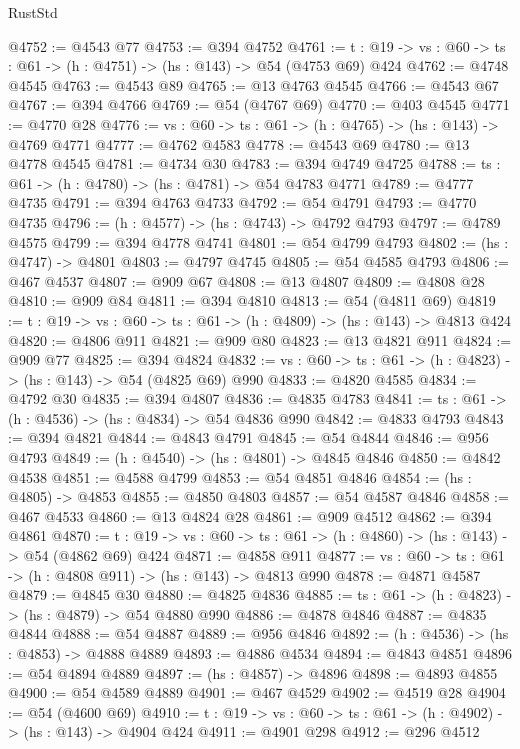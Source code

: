 \begin{lexlean}{RustStd}
\begin{coremodule}
@4752 := @4543 @77
@4753 := @394 @4752
@4761 := {t : @19} -> {vs : @60} -> {ts : @61} -> (h : @4751) -> (hs : @143) -> @54 (@4753 @69) @424
@4762 := @4748 @4545
@4763 := @4543 @89
@4765 := @13 @4763 @4545
@4766 := @4543 @67
@4767 := @394 @4766
@4769 := @54 (@4767 @69)
@4770 := @403 @4545
@4771 := @4770 @28
@4776 := {vs : @60} -> {ts : @61} -> (h : @4765) -> (hs : @143) -> @4769 @4771
@4777 := @4762 @4583
@4778 := @4543 @69
@4780 := @13 @4778 @4545
@4781 := @4734 @30
@4783 := @394 @4749 @4725
@4788 := {ts : @61} -> (h : @4780) -> (hs : @4781) -> @54 @4783 @4771
@4789 := @4777 @4735
@4791 := @394 @4763 @4733
@4792 := @54 @4791
@4793 := @4770 @4735
@4796 := (h : @4577) -> (hs : @4743) -> @4792 @4793
@4797 := @4789 @4575
@4799 := @394 @4778 @4741
@4801 := @54 @4799 @4793
@4802 := (hs : @4747) -> @4801
@4803 := @4797 @4745
@4805 := @54 @4585 @4793
@4806 := @467 @4537
@4807 := @909 @67
@4808 := @13 @4807
@4809 := @4808 @28
@4810 := @909 @84
@4811 := @394 @4810
@4813 := @54 (@4811 @69)
@4819 := {t : @19} -> {vs : @60} -> {ts : @61} -> (h : @4809) -> (hs : @143) -> @4813 @424
@4820 := @4806 @911
@4821 := @909 @80
@4823 := @13 @4821 @911
@4824 := @909 @77
@4825 := @394 @4824
@4832 := {vs : @60} -> {ts : @61} -> (h : @4823) -> (hs : @143) -> @54 (@4825 @69) @990
@4833 := @4820 @4585
@4834 := @4792 @30
@4835 := @394 @4807
@4836 := @4835 @4783
@4841 := {ts : @61} -> (h : @4536) -> (hs : @4834) -> @54 @4836 @990
@4842 := @4833 @4793
@4843 := @394 @4821
@4844 := @4843 @4791
@4845 := @54 @4844
@4846 := @956 @4793
@4849 := (h : @4540) -> (hs : @4801) -> @4845 @4846
@4850 := @4842 @4538
@4851 := @4588 @4799
@4853 := @54 @4851 @4846
@4854 := (hs : @4805) -> @4853
@4855 := @4850 @4803
@4857 := @54 @4587 @4846
@4858 := @467 @4533
@4860 := @13 @4824 @28
@4861 := @909 @4512
@4862 := @394 @4861
@4870 := {t : @19} -> {vs : @60} -> {ts : @61} -> (h : @4860) -> (hs : @143) -> @54 (@4862 @69) @424
@4871 := @4858 @911
@4877 := {vs : @60} -> {ts : @61} -> (h : @4808 @911) -> (hs : @143) -> @4813 @990
@4878 := @4871 @4587
@4879 := @4845 @30
@4880 := @4825 @4836
@4885 := {ts : @61} -> (h : @4823) -> (hs : @4879) -> @54 @4880 @990
@4886 := @4878 @4846
@4887 := @4835 @4844
@4888 := @54 @4887
@4889 := @956 @4846
@4892 := (h : @4536) -> (hs : @4853) -> @4888 @4889
@4893 := @4886 @4534
@4894 := @4843 @4851
@4896 := @54 @4894 @4889
@4897 := (hs : @4857) -> @4896
@4898 := @4893 @4855
@4900 := @54 @4589 @4889
@4901 := @467 @4529
@4902 := @4519 @28
@4904 := @54 (@4600 @69)
@4910 := {t : @19} -> {vs : @60} -> {ts : @61} -> (h : @4902) -> (hs : @143) -> @4904 @424
@4911 := @4901 @298
@4912 := @296 @4512

\end{coremodule}
\end{lexlean}
